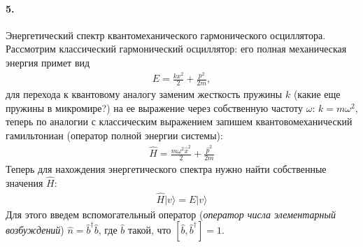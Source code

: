 


	
\paragraph{5.}
Энергетический спектр квантомеханического гармонического осциллятора.\\

Рассмотрим классический гармонический осциллятор: его полная механическая энергия примет вид
\begin{gather*}
E = \frac{kx^2}{2}+\frac{p^2}{2m},
\end{gather*}
для перехода к квантовому аналогу заменим жесткость пружины $k$ (какие еще пружины в микромире?) на ее выражение через собственную частоту $\omega$: $k=m\omega^2$, теперь по аналогии с классическим выражением запишем квантовомеханический гамильтониан (оператор полной энергии системы):
\begin{gather*}
\hat{H} = \frac{m\omega^2\hat{x}^2}{2}+\frac{\hat{p}^2}{2m}
\end{gather*}
Теперь для нахождения энергетического спектра нужно найти собственные значения $\hat{H}$:
\begin{gather*}
\hat{H}|v\rangle = E|v\rangle
\end{gather*}
Для этого введем вспомогательный оператор (\textit{оператор числа элементарный возбуждений}) $\hat{n}=\hat{b}^\dagger\hat{b}$, где $\hat{b}$ такой, что $[\hat{b},\hat{b}^\dagger]=1$.

